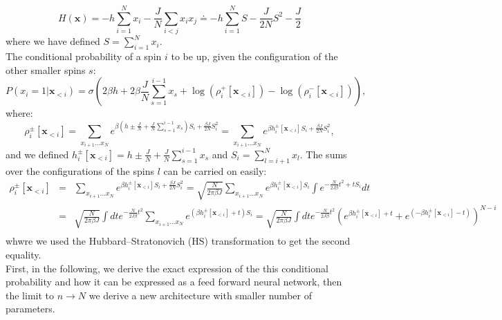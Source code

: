 \documentclass{article}
\begin{document}
\begin{equation}
H\left(\mathbf{x}\right)=-h\sum_{i=1}^{N}x_{i}-\frac{J}{N}\sum_{i<j}x_{i}x_{j}
\doteq -h\sum_{i=1}^{N} S - \frac{J}{2N}S^2 - \frac{J}{2}
\end{equation}
 where we have defined $S=\sum_{i=1}^{N}x_{i}$.\\
 The conditional probability of a spin $i$ to be up, given the configuration of the other smaller spins $s$:
\begin{equation}
P\left(x_{i}=1|\mathbf{x}_{<i}\right) = \sigma\left( 
 2 \beta h + 2 \beta \frac{J}{N}\sum_{s=1}^{i-1}x_s +\log(\rho_i^+[\mathbf{x}_{<i}]) - \log(\rho_i^-[\mathbf{x}_{<i}])
\right),
\end{equation}
where:
\begin{equation*}
\rho_i^{\pm}[\mathbf{x}_{<i}] = \sum_{x_{i+1}\dots 
x_{N}}e^{\beta \left(h\pm\frac{J}{N}+\frac{J}{N}\sum_{s=1}^{i-1}x_{s}\right)S_{i}+\frac{\beta J}{2N}S_{i}^{2}} = 
\sum_{x_{i+1}\dots x_{N}} e^{\beta h_i^{\pm}[\mathbf{x}_{<i}]S_i +\frac{\beta J}{2N}S_{i}^{2}},
\end{equation*}
and we defined $h_i^{\pm}[\mathbf{x}_{<i}] = h\pm\frac{J}{N}+\frac{J}{N}\sum_{s=1}^{i-1}x_{s}$ and $S_i=\sum_{l=i+1}^{N}x_{l}$. The sums over the configurations of the spins $l$ can be carried on easily:
\begin{eqnarray*}
 \rho_i^{\pm}[\mathbf{x}_{<i}] & = & \sum_{x_{i+1}\dots x_{N}} e^{\beta h_i^{\pm}[\mathbf{x}_{<i}]S_i +\frac{\beta J}{2N}S_{i}^{2}}
  = \sqrt{\frac{N}{2\pi \beta J}}\sum_{x_{i+1}\dots x_{N}}e^{\beta h_i^{\pm}[\mathbf{x}_{<i}] S_{i}}\int e^{-\frac{N}{2J \beta}t^{2}+t S_{i}} dt\\
 & = & \sqrt{\frac{N}{2\pi \beta J}}\int dt e^{-\frac{N}{2J \beta}t^{2}} \sum_{x_{i+1}\dots x_{N}}e^{(\beta h_i^{\pm}[\mathbf{x}_{<i}] + t) S_{i}}  
 =  \sqrt{\frac{N}{2\pi \beta J}}\int dt e^{-\frac{N}{2J \beta}t^{2}} \left(e^{\beta h_i^{\pm}[\mathbf{x}_{<i}] + t} + e^{ (-\beta h_i^{\pm}[\mathbf{x}_{<i}] - t)} \right)^{N-i}  \\ 
 \label{eq:rho_last_exact}
 \end{eqnarray*}
 whwre we used the Hubbard–Stratonovich (HS) transformation to get the second equality.\\
 First, in the following,  we derive the exact expression of the this conditional probability and how it can be expressed as a feed forward neural network, then the limit to $n\rightarrow N$ we derive a new architecture with smaller number of parameters.\\
\end{document}
